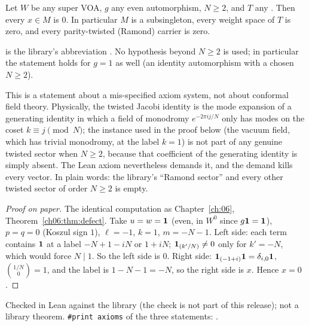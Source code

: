 \begin{theorem}\label{l17:thm:twistvacuous}
Let $W$ be any super VOA, $g$ any even automorphism, $N\ge2$, and $T$ any
. Then every $x\in M$ is $0$. In particular $M$ is a
subsingleton, every weight space of $T$ is zero, and every parity-twisted (Ramond) carrier
 is zero.
\end{theorem}
\begin{dictionary}
 is the library's abbreviation
. No hypothesis beyond $N\ge2$ is used; in particular the
statement holds for $g=1$ as well (an identity automorphism with a chosen $N\ge 2$).
\end{dictionary}
\begin{physics}
This is a statement about a mis-specified axiom system, not about conformal field theory. Physically,
the twisted Jacobi identity is the mode expansion of a generating identity in which a field of
monodromy $e^{-2\pi ij/N}$ only has modes on the coset $k\equiv j\pmod N$; the instance used in the
proof below (the vacuum field, which has trivial monodromy, at the label $k=1$) is not part of any
genuine twisted sector when $N\ge2$, because that coefficient of the generating identity is simply
absent. The Lean axiom nevertheless demands it, and the demand kills every vector. In plain words:
the library's ``Ramond sector'' and every other twisted sector of order $N\ge2$ is empty.
\end{physics}
\begin{proof}[Proof on paper]
The identical computation as Chapter~\ref{ch:06}, Theorem~\ref{ch06:thm:defect}. Take
$u=w=\mathbf{1}$ (even, in $W^0$ since $g\mathbf{1}=\mathbf{1}$), $p=q=0$ (Koszul sign
$1$), $\ell=-1$, $k=1$, $m=-N-1$. Left side: each term contains $\mathbf{1}$ at a label
$-N+1-iN$ or $1+iN$; $\mathbf{1}_{(k'/N)}\neq0$ only for $k'=-N$, which would force $N\mid1$.
So the left side is $0$. Right side: $\mathbf{1}_{(-1+i)}\mathbf{1}=\delta_{i,0}\mathbf{1}$,
$\binom{1/N}0=1$, and the label is $1-N-1=-N$, so the right side is $x$. Hence $x=0$.
\end{proof}
\begin{status}
Checked in Lean against the library (the check is not part of this release); not a library theorem. \texttt{\#print axioms} of
the three statements: .
\end{status}

